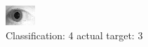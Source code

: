 \begin{figure}[h!]
\begin{center}
\includegraphics[width=0.60\columnwidth]{figures/ID1867_class_4_target_3.png}
\end{center}
\caption{ Classification: 4 actual target: 3}
\label{fig:ID1867_class_4_target_3}
\end{figure}
